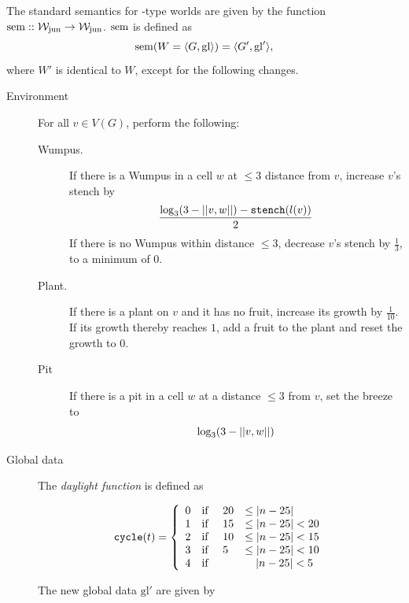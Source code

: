 \begin{definition}
The standard semantics for \wjun-type worlds are given by the function $\mathrm{sem} :: \mathtt{\mathcal{W}_{\mathrm{jun}} \rightarrow \mathcal{W}_{\mathrm{jun}}}$. $\mathrm{sem}$ is defined as 
$$\mathrm{sem}(W = \langle G, \mathrm{gl} \rangle) = \langle G', \mathrm{gl}' \rangle, $$
where $W'$ is identical to $W$, except for the following changes.\\

\begin{description}
	\item[Environment] For all $v \in V(G)$, perform the following:
	
	\begin{description}
		\item[Wumpus.] If there is a Wumpus in a cell $w$ at $\leq 3$ distance from $v$, increase $v$'s stench by
		$$
			\frac{
				\log_{3}(3 - ||{v},{w}||) - \mathtt{stench}(l(v))
			}{2}
		$$
		If there is no Wumpus within distance $\leq 3$, decrease $v$'s stench by $\frac{1}{3}$, to a minimum of 0.
		
		\item[Plant.] If there is a plant on $v$ and it has no fruit, increase its growth by $\frac{1}{10}$. If its growth thereby reaches $1$, add a fruit to the plant and reset the growth to 0.
		
		\item[Pit] If there is a pit in a cell $w$ at a distance $\leq 3$ from $v$, set the breeze to
 		$$
			\log_{3}(3 - ||{v},{w}||)
		$$
	\end{description}
	
	\item[Global data] The {\em daylight function} is defined as
	
	$$
			\mathtt{cycle}(t) = 
			\left\{
				\begin{array}{l l l l}
					0 & \textnormal{if } & 20 & \leq |n - 25|\\
					1 & \textnormal{if } & 15 & \leq |n - 25| < 20\\
					2 & \textnormal{if } & 10 & \leq |n - 25| < 15\\
					3 & \textnormal{if } & 5 & \leq |n - 25| < 10\\
					4 & \textnormal{if } & & \ \ \ |n - 25| < 5
				\end{array}
			\right.
	$$
	
	The new global data $\mathrm{gl}'$ are given by
	

\end{description}
\end{definition}

